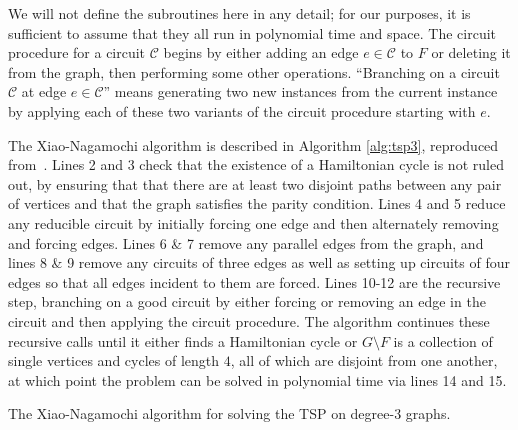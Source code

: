 We will not define the subroutines here in any detail; for our purposes, it is sufficient to assume that they all run in polynomial time and space. The circuit procedure for a circuit $\mathcal{C}$ begins by either adding an edge $e \in \mathcal{C}$ to $F$ or deleting it from the graph, then performing some other operations. ``Branching on a circuit $\mathcal{C}$ at edge $e \in \mathcal{C}$'' means generating two new instances from the current instance by applying each of these two variants of the circuit procedure starting with $e$.

The Xiao-Nagamochi algorithm is described in Algorithm \ref{alg:tsp3}, reproduced from~\cite{xiao2016degree3}. Lines 2 and 3 check that the existence of a Hamiltonian cycle is not ruled out, by ensuring that that there are at least two disjoint paths between any pair of vertices and that the graph satisfies the parity condition. Lines 4 and 5 reduce any reducible circuit by initially forcing one edge and then alternately removing and forcing edges. Lines 6 \& 7 remove any parallel edges from the graph, and lines 8 \& 9 remove any circuits of three edges as well as setting up circuits of four edges so that all edges incident to them are forced. Lines 10-12 are the recursive step, branching on a good circuit by either forcing or removing an edge in the circuit and then applying the circuit procedure. The algorithm continues these recursive calls until it either finds a Hamiltonian cycle or $G \setminus F$ is a collection of single vertices and cycles of length $4$, all of which are disjoint from one another, at which point the problem can be solved in polynomial time via lines 14 and 15.

\begin{algorithm}
\caption{\label{alg:tsp3} The Xiao-Nagamochi algorithm for solving the TSP on degree-3 graphs.}
\end{algorithm}

